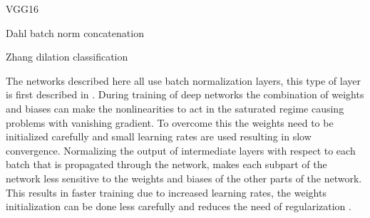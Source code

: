 VGG16




Dahl
batch norm
concatenation




Zhang
dilation
classification









The networks described here all use batch normalization layers, this type of layer is first described in \cite{ioffe2015batch}. During training of deep networks the combination of weights and biases can make the nonlinearities to act in the saturated regime causing problems with vanishing gradient. To overcome this the weights need to be initialized carefully and small learning rates are used resulting in slow convergence. Normalizing the output of intermediate layers with respect to each batch that is propagated through the network, makes each subpart of the network less sensitive to the weights and biases of the other parts of the network. This results in faster training due to increased learning rates, the weights initialization can be done less carefully and reduces the need of regularization \cite{ioffe2015batch}.


